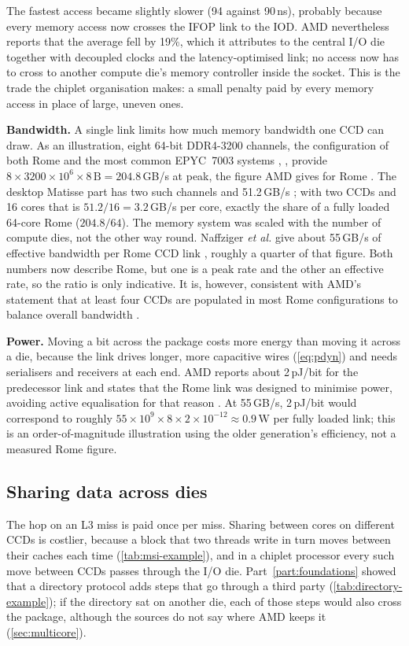 


The fastest access became slightly slower (94 against 90\,ns), probably because every memory access now crosses the IFOP link to the IOD. AMD nevertheless reports that the average fell by 19\%, which it attributes to the central I/O die together with decoupled clocks and the latency-optimised link; no access now has to cross to another compute die's memory controller inside the socket. This is the trade the chiplet organisation makes: a small penalty paid by every memory access in place of large, uneven ones.

\textbf{Bandwidth.} A single link limits how much memory bandwidth one CCD can draw. As an illustration, eight 64-bit DDR4-3200 channels, the configuration of both Rome and the most common EPYC~7003 systems \cite[slide~19]{suggs2019zen2}, \cite{amd2022epyc7003}, provide $8 \times 3200 \times 10^6 \times 8\,\mathrm{B} = 204.8$\,GB/s at peak, the figure AMD gives for Rome \cite[slide~19]{suggs2019zen2}. The desktop Matisse part has two such channels and 51.2\,GB/s \cite[slide~15]{suggs2019zen2}; with two CCDs and 16 cores that is $51.2/16 = 3.2$\,GB/s per core, exactly the share of a fully loaded 64-core Rome ($204.8/64$). The memory system was scaled with the number of compute dies, not the other way round. Naffziger \emph{et al.} give about 55\,GB/s of effective bandwidth per Rome CCD link \cite{naffziger2020chiplet}, roughly a quarter of that figure. Both numbers now describe Rome, but one is a peak rate and the other an effective rate, so the ratio is only indicative. It is, however, consistent with AMD's statement that at least four CCDs are populated in most Rome configurations to balance overall bandwidth \cite{naffziger2020chiplet}.

\textbf{Power.} Moving a bit across the package costs more energy than moving it across a die, because the link drives longer, more capacitive wires (\cref{eq:pdyn}) and needs serialisers and receivers at each end. AMD reports about 2\,pJ/bit for the predecessor link and states that the Rome link was designed to minimise power, avoiding active equalisation for that reason \cite{naffziger2020chiplet}. At 55\,GB/s, 2\,pJ/bit would correspond to roughly $55 \times 10^9 \times 8 \times 2 \times 10^{-12} \approx 0.9$\,W per fully loaded link; this is an order-of-magnitude illustration using the older generation's efficiency, not a measured Rome figure.

\subsection{Sharing data across dies}
\label{sec:cross-ccd}
The hop on an L3 miss is paid once per miss. Sharing between cores on different CCDs is costlier, because a block that two threads write in turn moves between their caches each time (\cref{tab:msi-example}), and in a chiplet processor every such move between CCDs passes through the I/O die. Part~\ref{part:foundations} showed that a directory protocol adds steps that go through a third party (\cref{tab:directory-example}); if the directory sat on another die, each of those steps would also cross the package, although the sources do not say where AMD keeps it (\cref{sec:multicore}).

